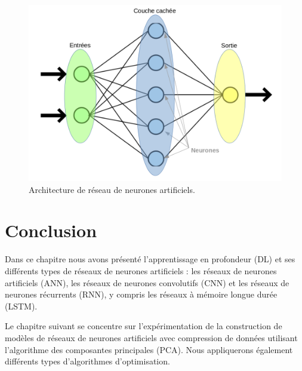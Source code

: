 \begin{figure}[!h]
\centering
\includegraphics[scale=0.3]{Images/ANN.png}
\caption{Architecture de réseau de neurones artificiels.}
\label{fig:17}
\end{figure}

\newpage
\section{ Conclusion }

Dans ce chapitre nous avons présenté l'apprentissage en profondeur (DL) et ses différents types de réseaux de neurones artificiels : les réseaux de neurones artificiels (ANN), les réseaux de neurones convolutifs (CNN) et les réseaux de neurones récurrents (RNN), y compris les réseaux à mémoire longue durée (LSTM).

Le chapitre suivant se concentre sur l'expérimentation de la construction de modèles de réseaux de neurones artificiels avec compression de données utilisant l'algorithme des composantes principales (PCA). 
Nous appliquerons également différents types d'algorithmes d'optimisation.



